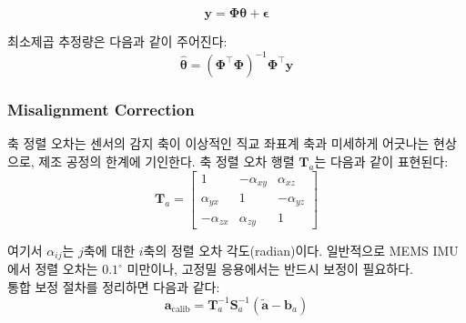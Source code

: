                 \begin{equation}
                    \mathbf{y} = \boldsymbol{\Phi}\boldsymbol{\theta} + \boldsymbol{\epsilon}
                    \label{eq:accel_ls}
                \end{equation}

                최소제곱 추정량은 다음과 같이 주어진다:\\

                \begin{equation}
                    \hat{\boldsymbol{\theta}} = \left(\boldsymbol{\Phi}^\top \boldsymbol{\Phi}\right)^{-1} \boldsymbol{\Phi}^\top \mathbf{y}
                    \label{eq:accel_ls_solution}
                \end{equation}

        \subsubsection{Misalignment Correction}
            축 정렬 오차는 센서의 감지 축이 이상적인 직교 좌표계 축과 미세하게 어긋나는 현상으로, 제조 공정의 한계에 기인한다. 축 정렬 오차 행렬 $\mathbf{T}_a$는 다음과 같이 표현된다:\\

            \begin{equation}
                \mathbf{T}_a = \begin{bmatrix}
                    1       & -\alpha_{xy} & \alpha_{xz} \\
                    \alpha_{yx} & 1       & -\alpha_{yz} \\
                    -\alpha_{zx} & \alpha_{zy} & 1
                \end{bmatrix}
                \label{eq:misalignment_matrix}
            \end{equation}

            \noindent 여기서 $\alpha_{ij}$는 $j$축에 대한 $i$축의 정렬 오차 각도(radian)이다. 일반적으로 MEMS IMU에서 정렬 오차는 $0.1^\circ$ 미만이나, 고정밀 응용에서는 반드시 보정이 필요하다.\\

            통합 보정 절차를 정리하면 다음과 같다:\\

            \begin{equation}
                \mathbf{a}_{\text{calib}} = \mathbf{T}_a^{-1} \mathbf{S}_a^{-1} \left( \tilde{\mathbf{a}} - \mathbf{b}_a \right)
                \label{eq:accel_full_calib}
            \end{equation}

